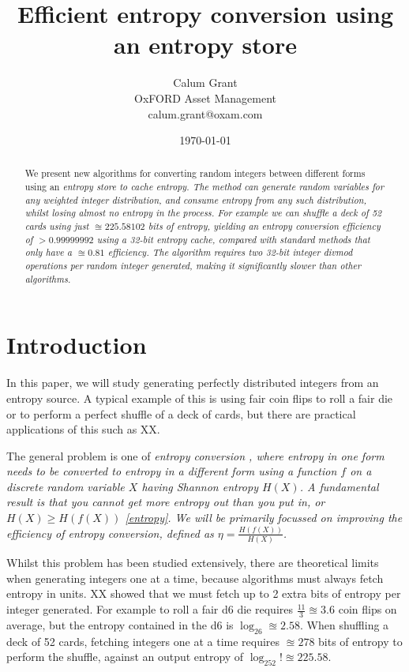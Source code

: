 \documentclass[12pt]{article}
\title{Efficient entropy conversion using an entropy store}
\author{Calum Grant \\
OxFORD Asset Management \\
calum.grant@oxam.com}
\date{\today}
\begin{document}
\maketitle

\begin{abstract}
    We present new algorithms for converting random integers between different forms using an \em entropy store \em to cache entropy. The method can generate random variables for any weighted integer distribution, and consume entropy from any such distribution, whilst losing almost no entropy in the process.  For example we can shuffle a deck of 52 cards using just $\approxeq 225.58102$ bits of entropy, yielding an entropy conversion efficiency of $>0.99999992$ using a 32-bit entropy cache, compared with standard methods that only have a $\approxeq 0.81$ efficiency.  The algorithm requires two 32-bit integer divmod operations per random integer generated, making it significantly slower than other algorithms.
\end{abstract}

\section{Introduction}

In this paper, we will study generating perfectly distributed integers from an entropy source. A typical example of this is using fair coin flips to roll a fair die or to perform a perfect shuffle of a deck of cards, but there are practical applications of this such as XX.

The general problem is one of \em entropy conversion \em, where entropy in one form needs to be converted to entropy in a different form using a function $f$ on a discrete random variable $X$ having Shannon entropy $H(X)$.  A fundamental result is that you cannot get more entropy out than you put in, or $H(X) \ge H(f(X))$ \ref{entropy}. We will be primarily focussed on improving the \em efficiency \em of entropy conversion, defined as $\eta = \frac{H(f(X))}{H(X)}$.

Whilst this problem has been studied extensively, there are theoretical limits when generating integers one at a time, because algorithms must always fetch entropy in units. XX showed that we must fetch up to 2 extra bits of entropy per integer generated.  For example to roll a fair d6 die requires $\frac{11}{3} \approxeq 3.6$ coin flips on average, but the entropy contained in the d6 is $\log_26 \approxeq 2.58$. When shuffling a deck of 52 cards, fetching integers one at a time requires $\approxeq 278$ bits of entropy to perform the shuffle, against an output entropy of $\log_252! \approxeq 225.58$.
\end{document}
